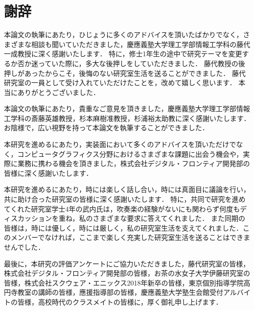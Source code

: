 \chapter*{謝辞}
\label{chap:thanks}
%
%
本論文の執筆にあたり，ひじょうに多くのアドバイスを頂いたばかりでなく，さまざまな相談も聞いていただきました，慶應義塾大学理工学部情報工学科の藤代一成教授に深く感謝いたします．
特に，修士1年生の途中で研究テーマを変更するか否か迷っていた際に，多大な後押しをしていただきました．
藤代教授の後押しがあったからこそ，後悔のない研究室生活を送ることができました．
藤代研究室の一員として受け入れていただけたことを，改めて嬉しく思います．
本当にありがとうございました．\\
\par
本論文の執筆にあたり，貴重なご意見を頂きました，慶應義塾大学理工学部情報工学科の斎藤英雄教授，杉本麻樹准教授，杉浦裕太助教に深く感謝いたします．
お陰様で，広い視野を持って本論文を執筆することができました．\\
\par
本研究を進めるにあたり，実装面において多くのアドバイスを頂いただけでなく，コンピュータグラフィクス分野におけるさまざまな課題に出会う機会や，実際に業務に携わる機会を頂きました，株式会社デジタル・フロンティア開発部の皆様に深く感謝いたします．\\
\par
本研究を進めるにあたり，時には楽しく話し合い，時には真面目に議論を行い，共に助け合った研究室の皆様に深く感謝いたします．
特に，共同で研究を進めてくれた研究室学士4年の武内氏は，吹奏楽の経験がないにも関わらず何度もディスカッションを重ね，私のさまざまな要求に答えてくれました．
また同期の皆様は，時には優しく，時には厳しく，私の研究室生活を支えてくれました．このメンバーでなければ，ここまで楽しく充実した研究室生活を送ることはできませんでした．\\
\par
最後に，本研究の評価アンケートにご協力いただきました，藤代研究室の皆様，株式会社デジタル・フロンティア開発部の皆様，お茶の水女子大学伊藤研究室の皆様，株式会社スクウェア・エニックス2018年新卒の皆様，東京個別指導学院高円寺教室の講師の皆様，應援指導部の皆様，慶應義塾大学塾生会館受付アルバイトの皆様，高校時代のクラスメイトの皆様に，厚く御礼申し上げます．